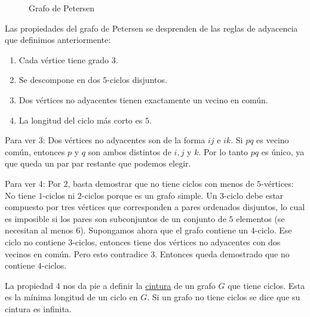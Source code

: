 \begin{figure}
    \centering
    \caption{Grafo de Petersen}
    \label{fig:petersen}
\end{figure}

\break

\begin{nota}
    Las propiedades del grafo de Petersen se desprenden de las reglas de adyacencia que definimos anteriormente:
    
    \begin{enumerate}
        \item Cada vértice tiene grado $3$.
        \item Se descompone en dos $5$-ciclos disjuntos.
        \item Dos vértices no adyacentes tienen exactamente un vecino en común.
        \item La longitud del ciclo más corto es $5$.
    \end{enumerate}
\end{nota}

\begin{ejer}
    Para ver 3: Dos vértices no adyacentes son de la forma $ij$ e $ik$. Si $pq$ es vecino común, entonces $p$ y $q$ son ambos distintos de $i, j$ y $k$. Por lo tanto $pq$ es único, ya que queda un par par restante que podemos elegir.
    
    Para ver 4: Por $2$, basta demostrar que no tiene ciclos con menos de $5$-vértices: No tiene $1$-ciclos ni $2$-ciclos porque es un grafo simple. Un $3$-ciclo debe estar compuesto por tres vértices que corresponden a pares ordenados disjuntos, lo cual es imposible si los pares son subconjuntos de un conjunto de $5$ elementos (se necesitan al menos $6$). Supongamos ahora que el grafo contiene un $4$-ciclo. Ese ciclo no contiene $3$-ciclos, entonces tiene dos vértices no adyacentes con dos vecinos en común. Pero esto contradice 3. Entonces queda demostrado que no contiene $4$-ciclos.
\end{ejer}

\begin{defn}
    La propiedad 4 nos da pie a definir la \ul{cintura} de un grafo $G$ que tiene ciclos. Esta es la mínima longitud de un ciclo en $G$. Si un grafo no tiene ciclos se dice que su cintura es infinita.
\end{defn}

